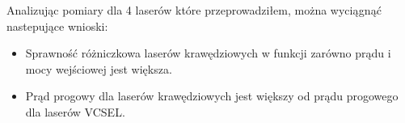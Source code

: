 Analizując pomiary dla 4 laserów które przeprowadziłem, można wyciągnąć nastepujące wnioski:
\begin{itemize}
\item Sprawność różniczkowa laserów krawędziowych w funkcji zarówno prądu i mocy wejściowej jest większa.
\item Prąd progowy dla laserów krawędziowych jest większy od prądu progowego dla laserów VCSEL.
\end{itemize}
